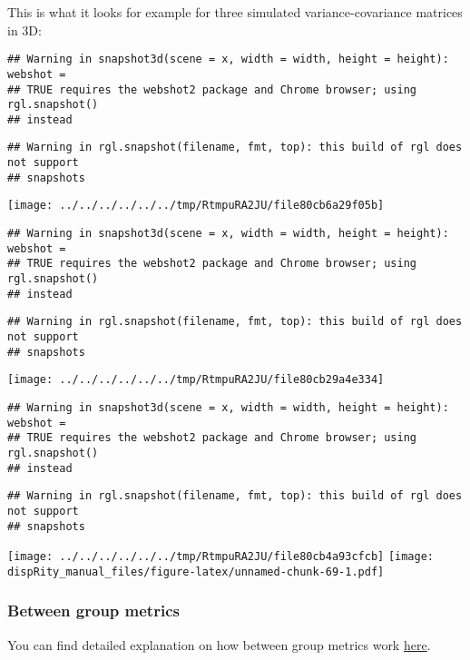\documentclass[
]{book}
\begin{document}
This is what it looks for example for three simulated variance-covariance matrices in 3D:

\begin{verbatim}
## Warning in snapshot3d(scene = x, width = width, height = height): webshot =
## TRUE requires the webshot2 package and Chrome browser; using rgl.snapshot()
## instead
\end{verbatim}

\begin{verbatim}
## Warning in rgl.snapshot(filename, fmt, top): this build of rgl does not support
## snapshots
\end{verbatim}

\texttt{[image: ../../../../../../tmp/RtmpuRA2JU/file80cb6a29f05b]}

\begin{verbatim}
## Warning in snapshot3d(scene = x, width = width, height = height): webshot =
## TRUE requires the webshot2 package and Chrome browser; using rgl.snapshot()
## instead
\end{verbatim}

\begin{verbatim}
## Warning in rgl.snapshot(filename, fmt, top): this build of rgl does not support
## snapshots
\end{verbatim}

\texttt{[image: ../../../../../../tmp/RtmpuRA2JU/file80cb29a4e334]}

\begin{verbatim}
## Warning in snapshot3d(scene = x, width = width, height = height): webshot =
## TRUE requires the webshot2 package and Chrome browser; using rgl.snapshot()
## instead
\end{verbatim}

\begin{verbatim}
## Warning in rgl.snapshot(filename, fmt, top): this build of rgl does not support
## snapshots
\end{verbatim}

\texttt{[image: ../../../../../../tmp/RtmpuRA2JU/file80cb4a93cfcb]}
\texttt{[image: dispRity\_manual\_files/figure-latex/unnamed-chunk-69-1.pdf]}

\hypertarget{betweengroupmetricslist}{%
\subsubsection{Between group metrics}\label{betweengroupmetricslist}}

You can find detailed explanation on how between group metrics work \protect\hyperlink{betweengroupmetricsexplain}{here}.
\end{document}
